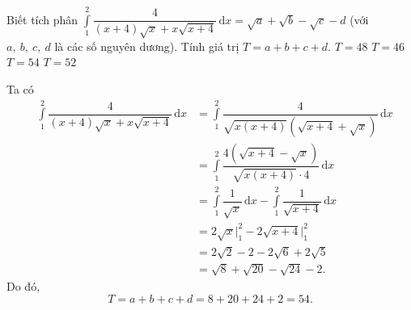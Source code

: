 \begin{ex}%
	Biết tích phân $\displaystyle\int\limits_1^2 \dfrac{4}{(x+4)\sqrt{x}+x\sqrt{x+4}}\mathrm{\,d}x=\sqrt{a}+\sqrt{b}-\sqrt{c}-d$ (với $a,~b,~c,~d$ là các số nguyên dương). Tính giá trị $T=a+b+c+d$.
	\choice
	{$T=48$}
	{$T=46$}
	{\True $T=54$}
	{$T=52$}
	\loigiai
	{
		Ta có 
		\begin{eqnarray*}
			& \displaystyle\int\limits_1^2 \dfrac{4}{(x+4)\sqrt{x}+x\sqrt{x+4}}\mathrm{\,d}x&=\displaystyle\int\limits_1^2 \dfrac{4}{\sqrt{x(x+4)}\left(\sqrt{x+4}+\sqrt{x}\right)}\mathrm{\,d}x\\
			&  &= \displaystyle\int\limits_1^2 \dfrac{4\left(\sqrt{x+4}-\sqrt{x}\right)}{\sqrt{x(x+4)}\cdot4}\mathrm{\,d}x\\
			&  &= \displaystyle\int\limits_1^2 \dfrac{1}{\sqrt{x}}\mathrm{\,d}x- \displaystyle\int\limits_1^2 \dfrac{1}{\sqrt{x+4}}\mathrm{\,d}x\\
			&  &= 2\sqrt{x}\bigg|_1^2-2\sqrt{x+4}\bigg|_1^2\\
			&  &= 2\sqrt{2}-2-2\sqrt{6}+2\sqrt{5}\\
			&  &= \sqrt{8}+\sqrt{20}-\sqrt{24}-2.
		\end{eqnarray*}
		Do đó, \[T=a+b+c+d=8+20+24+2=54.\]
		
	}
\end{ex}

